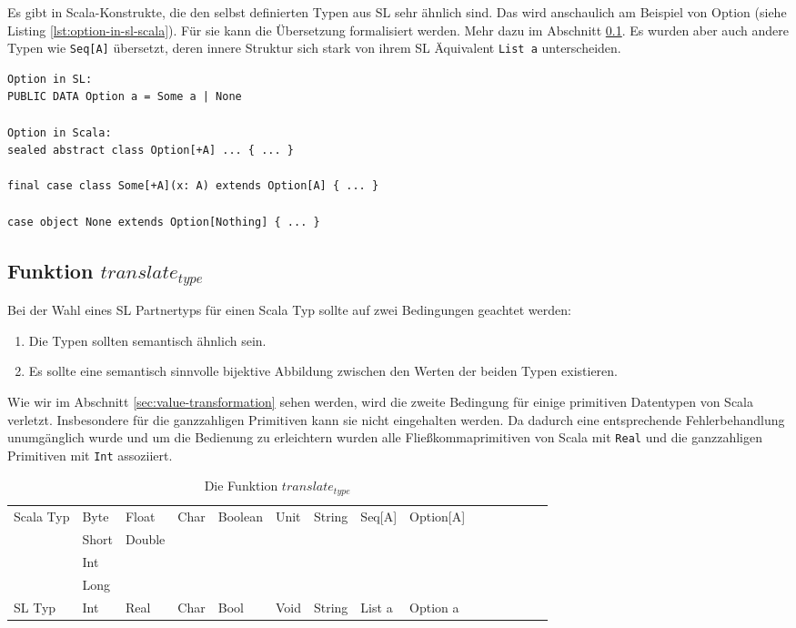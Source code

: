 \documentclass[12pt,bibtotoc]{scrreprt}
\begin{document}
Es gibt in Scala-Konstrukte, die den selbst definierten Typen aus \ac{SL} sehr ähnlich sind. Das wird anschaulich am Beispiel von Option (siehe Listing \ref{lst:option-in-sl-scala}). Für sie kann die Übersetzung formalisiert werden. Mehr dazu im Abschnitt \ref{subsec:translate_type}. Es wurden aber auch andere Typen wie \lstinline!Seq[A]! übersetzt, deren innere Struktur sich stark von ihrem SL Äquivalent \lstinline!List a! unterscheiden.

\begin{lstlisting}[caption=Option in \ac{SL} und Scala, label=lst:option-in-sl-scala, float=h]
Option in SL:
PUBLIC DATA Option a = Some a | None

Option in Scala:
sealed abstract class Option[+A] ... { ... }

final case class Some[+A](x: A) extends Option[A] { ... }

case object None extends Option[Nothing] { ... }
\end{lstlisting}

\subsection{Funktion $translate_{type}$}
\label{subsec:translate_type}


Bei der Wahl eines SL Partnertyps für einen Scala Typ sollte auf zwei Bedingungen geachtet werden:

\begin{enumerate}
 \item{Die Typen sollten semantisch ähnlich sein.}
 \item{Es sollte eine semantisch sinnvolle bijektive Abbildung zwischen den Werten der beiden Typen existieren. }
\end{enumerate}

Wie wir im Abschnitt \ref{sec:value-transformation} sehen werden, wird die zweite Bedingung für einige primitiven Datentypen von Scala verletzt. Insbesondere für die ganzzahligen Primitiven kann sie nicht eingehalten werden. Da dadurch eine entsprechende Fehlerbehandlung unumgänglich wurde und um die Bedienung zu erleichtern wurden alle Fließkommaprimitiven von Scala mit \lstinline!Real! und die ganzzahligen Primitiven mit \lstinline!Int! assoziiert.

\begin{table}[h]
\caption{Die Funktion $translate_{type}$}
\centering
\begin{tabular}{l|llllllllllllll}
Scala Typ & Byte & Float & Char & Boolean & Unit & String & Seq[A] & Option[A]\\
 & Short & Double\\
 & Int\\
 & Long\\
SL Typ & Int & Real & Char & Bool & Void & String & List a & Option a\\
\end{tabular}
\label{tab:translate_type}
\end{table}
\end{document}
